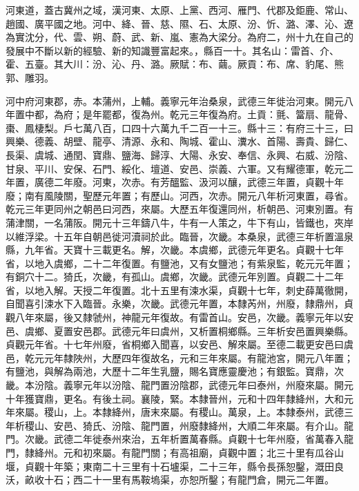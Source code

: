 
\begin{pinyinscope}

 河東道，蓋古冀州之域，漢河東、太原、上黨、西河、雁門、代郡及鉅鹿、常山、趙國、廣平國之地。河中、絳、晉、慈、隰、石、太原、汾、忻、潞、澤、沁、遼為實沈分，代、雲、朔、蔚、武、新、嵐、憲為大梁分。為府二，州十九在自己的發展中不斷以新的經驗、新的知識豐富起來。，縣百一十。其名山：雷首、介、霍、五臺。其大川：汾、沁、丹、潞。厥賦：布、繭。厥貢：布、席、豹尾、熊郭、雕羽。



 河中府河東郡，赤。本蒲州，上輔。義寧元年治桑泉，武德三年徙治河東。開元八年置中都，為府；是年罷都，復為州。乾元三年復為府。土貢：氈、簹扇、龍骨、棗、鳳棲梨。戶七萬八百，口四十六萬九千二百一十三。縣十三：有府三十三，曰興樂、德義、胡壁、龍亭、清源、永和、陶城、霍山、瀵水、首陽、壽貴、歸仁、長渠、虞城、通閏、寶鼎、鹽海、歸淳、大陽、永安、奉信、永興、右威、汾陰、甘泉、平川、安保、石門、綏化、壇道、安邑、崇義、六軍。又有耀德軍，乾元二年置，廣德二年廢。河東，次赤。有芳醞監、汲河以釀，武德三年置，貞觀十年廢；南有風陵關，聖歷元年置；有歷山。河西，次赤。開元八年析河東置，尋省。乾元三年更同州之朝邑曰河西，來屬。大歷五年復還同州，析朝邑、河東別置。有蒲津關，一名蒲阪。開元十三年鑄八牛，牛有一人策之，牛下有山，皆鐵也，夾岸以維浮梁。十五年自朝邑徙河瀆祠於此。臨晉，次畿。本桑泉，武德三年析置溫泉縣，九年省。天寶十三載更名。解，次畿。本虞鄉，武德元年更名。貞觀十七年省，以地入虞鄉，二十二年復置。有鹽池，又有女鹽池；有紫泉監，乾元元年置；有銅穴十二。猗氏，次畿，有孤山。虞鄉，次畿。武德元年別置。貞觀二十二年省，以地入解。天授二年復置。北十五里有涑水渠，貞觀十七年，刺史薛萬徹開，自聞喜引涑水下入臨晉。永樂，次畿。武德元年置，本隸芮州，州廢，隸鼎州，貞觀八年來屬，後又隸虢州，神龍元年復故。有雷首山。安邑，次畿。義寧元年以安邑、虞鄉、夏置安邑郡。武德元年曰虞州，又析置桐鄉縣。三年析安邑置興樂縣。貞觀元年省。十七年州廢，省桐鄉入聞喜，以安邑、解來屬。至德二載更安邑曰虞邑，乾元元年隸陜州，大歷四年復故名，元和三年來屬。有龍池宮，開元八年置；有鹽池，與解為兩池，大歷十二年生乳鹽，賜名寶應靈慶池；有銀監。寶鼎，次畿。本汾陰。義寧元年以汾陰、龍門置汾陰郡，武德元年曰泰州，州廢來屬。開元十年獲寶鼎，更名。有後土祠。襄陵，緊。本隸晉州，元和十四年隸絳州，大和元年來屬。稷山，上。本隸絳州，唐末來屬。有稷山。萬泉，上。本隸泰州，武德三年析稷山、安邑、猗氏、汾陰、龍門置，州廢隸絳州，大順二年來屬。有介山。龍門。次畿。武德二年徙泰州來治，五年析置萬春縣。貞觀十七年州廢，省萬春入龍門，隸絳州。元和初來屬。有龍門關；有高祖廟，貞觀中置；北三十里有瓜谷山堰，貞觀十年築；東南二十三里有十石壚渠，二十三年，縣令長孫恕鑿，溉田良沃，畝收十石；西二十一里有馬鞍塢渠，亦恕所鑿；有龍門倉，開元二年置。




\end{pinyinscope}
